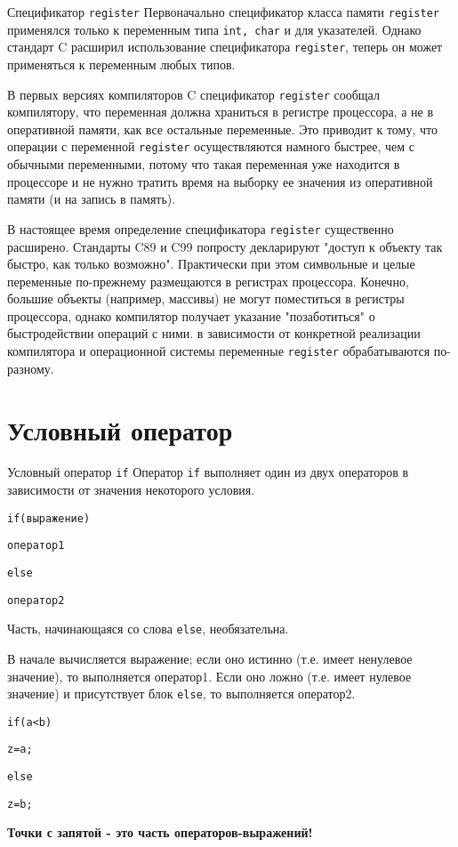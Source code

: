 \documentclass[xcolor=table]{beamer}
\begin{document}
\begin{frame}{Спецификатор \texttt{register}}
    Первоначально спецификатор класса памяти \texttt{register} применялся только к переменным типа \texttt{int, char} и для указателей. Однако стандарт C расширил использование спецификатора \texttt{register}, теперь он может применяться к переменным любых типов.
    
    В первых версиях компиляторов C спецификатор \texttt{register} сообщал компилятору, что переменная должна храниться в регистре процессора, а не в оперативной памяти, как все остальные переменные. Это приводит к тому, что операции с переменной \texttt{register} осуществляются намного быстрее, чем с обычными переменными, потому что такая переменная уже находится в процессоре и не нужно тратить время на выборку ее значения из оперативной памяти (и на запись в память).
    
    В настоящее время определение спецификатора \texttt{register} существенно расширено. Стандарты C89 и C99 попросту декларируют "доступ к объекту так быстро, как только возможно". Практически при этом символьные и целые переменные по-прежнему размещаются в регистрах процессора. Конечно, большие объекты (например, массивы) не могут поместиться в регистры процессора, однако компилятор получает указание "позаботиться" о быстродействии операций с ними. в зависимости от конкретной реализации компилятора и операционной системы переменные \texttt{register} обрабатываются по-разному.
\end{frame}

\section{Условный оператор}

\begin{frame}{Условный оператор \texttt{if}}
    Оператор \texttt{if} выполняет один из двух операторов в зависимости от значения некоторого условия.
    \begin{alltt}
        if (выражение)
            
        \qquad оператор1
        
        else
        
        \qquad оператор2
    \end{alltt}
    
    Часть, начинающаяся со слова \texttt{else}, необязательна.
    
    В начале вычисляется выражение; если оно истинно (т.е. имеет ненулевое значение), то выполняется оператор1. Если оно ложно (т.е. имеет нулевое значение) и присутствует блок \texttt{else}, то выполняется оператор2.
    \begin{alltt}
        if (a < b)
        
        \qquad z = a;
        
        else
        
        \qquad z = b;
    \end{alltt}
    \textbf{Точки с запятой - это часть операторов-выражений!}
\end{frame}
\end{document}
